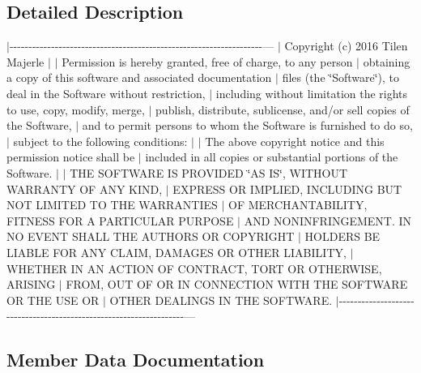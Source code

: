 \subsection{Detailed Description}
$\vert$-\/-\/-\/-\/-\/-\/-\/-\/-\/-\/-\/-\/-\/-\/-\/-\/-\/-\/-\/-\/-\/-\/-\/-\/-\/-\/-\/-\/-\/-\/-\/-\/-\/-\/-\/-\/-\/-\/-\/-\/-\/-\/-\/-\/-\/-\/-\/-\/-\/-\/-\/-\/-\/-\/-\/-\/-\/-\/-\/-\/-\/-\/-\/-\/-\/-\/-\/--- $\vert$ Copyright (c) 2016 Tilen Majerle $\vert$ $\vert$ Permission is hereby granted, free of charge, to any person $\vert$ obtaining a copy of this software and associated documentation $\vert$ files (the \char`\"{}\+Software\char`\"{}), to deal in the Software without restriction, $\vert$ including without limitation the rights to use, copy, modify, merge, $\vert$ publish, distribute, sublicense, and/or sell copies of the Software, $\vert$ and to permit persons to whom the Software is furnished to do so, $\vert$ subject to the following conditions\+: $\vert$ $\vert$ The above copyright notice and this permission notice shall be $\vert$ included in all copies or substantial portions of the Software. $\vert$ $\vert$ T\+HE S\+O\+F\+T\+W\+A\+RE IS P\+R\+O\+V\+I\+D\+ED \char`\"{}\+A\+S I\+S\char`\"{}, W\+I\+T\+H\+O\+UT W\+A\+R\+R\+A\+N\+TY OF A\+NY K\+I\+ND, $\vert$ E\+X\+P\+R\+E\+SS OR I\+M\+P\+L\+I\+ED, I\+N\+C\+L\+U\+D\+I\+NG B\+UT N\+OT L\+I\+M\+I\+T\+ED TO T\+HE W\+A\+R\+R\+A\+N\+T\+I\+ES $\vert$ OF M\+E\+R\+C\+H\+A\+N\+T\+A\+B\+I\+L\+I\+TY, F\+I\+T\+N\+E\+SS F\+OR A P\+A\+R\+T\+I\+C\+U\+L\+AR P\+U\+R\+P\+O\+SE $\vert$ A\+ND N\+O\+N\+I\+N\+F\+R\+I\+N\+G\+E\+M\+E\+NT. IN NO E\+V\+E\+NT S\+H\+A\+LL T\+HE A\+U\+T\+H\+O\+RS OR C\+O\+P\+Y\+R\+I\+G\+HT $\vert$ H\+O\+L\+D\+E\+RS BE L\+I\+A\+B\+LE F\+OR A\+NY C\+L\+A\+IM, D\+A\+M\+A\+G\+ES OR O\+T\+H\+ER L\+I\+A\+B\+I\+L\+I\+TY, $\vert$ W\+H\+E\+T\+H\+ER IN AN A\+C\+T\+I\+ON OF C\+O\+N\+T\+R\+A\+CT, T\+O\+RT OR O\+T\+H\+E\+R\+W\+I\+SE, A\+R\+I\+S\+I\+NG $\vert$ F\+R\+OM, O\+UT OF OR IN C\+O\+N\+N\+E\+C\+T\+I\+ON W\+I\+TH T\+HE S\+O\+F\+T\+W\+A\+RE OR T\+HE U\+SE OR $\vert$ O\+T\+H\+ER D\+E\+A\+L\+I\+N\+GS IN T\+HE S\+O\+F\+T\+W\+A\+RE. $\vert$-\/-\/-\/-\/-\/-\/-\/-\/-\/-\/-\/-\/-\/-\/-\/-\/-\/-\/-\/-\/-\/-\/-\/-\/-\/-\/-\/-\/-\/-\/-\/-\/-\/-\/-\/-\/-\/-\/-\/-\/-\/-\/-\/-\/-\/-\/-\/-\/-\/-\/-\/-\/-\/-\/-\/-\/-\/-\/-\/-\/-\/-\/-\/-\/-\/-\/-\/--- 

\subsection{Member Data Documentation}
\mbox{\label{struct_h_d44780___options__t_a28905366e0f6914c460923c66bafedcb}} 
